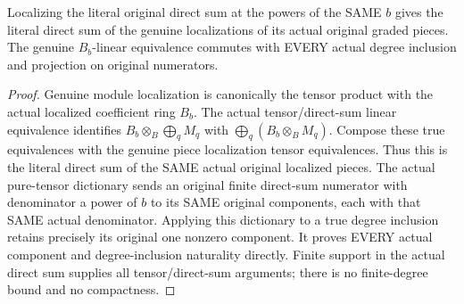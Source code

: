 \begin{theorem}
\label{hir:relative-normal-localgraded-directsum-naturality}
\leanok
{}
Localizing the literal original direct sum at the powers of the SAME $b$
gives the literal direct sum of the genuine localizations of its actual
original graded pieces. The genuine $B_b$-linear equivalence commutes with
EVERY actual degree inclusion and projection on original numerators.
\end{theorem}
\begin{proof}
Genuine module localization is canonically the tensor product with the
actual localized coefficient ring $B_b$. The actual tensor/direct-sum
linear equivalence identifies $B_b\otimes_B\bigoplus_q M_q$ with
$\bigoplus_q(B_b\otimes_B M_q)$. Compose these true equivalences with
the genuine piece localization tensor equivalences. Thus this is the
literal direct sum of the SAME actual original localized pieces. The
actual pure-tensor dictionary sends an original finite direct-sum numerator
with denominator a power of $b$ to its SAME original components, each with
that SAME actual denominator. Applying this dictionary to a true degree
inclusion retains precisely its original one nonzero component. It proves
EVERY actual component and degree-inclusion naturality directly. Finite
support in the actual direct sum supplies all tensor/direct-sum arguments;
there is no finite-degree bound and no compactness.
\end{proof}

